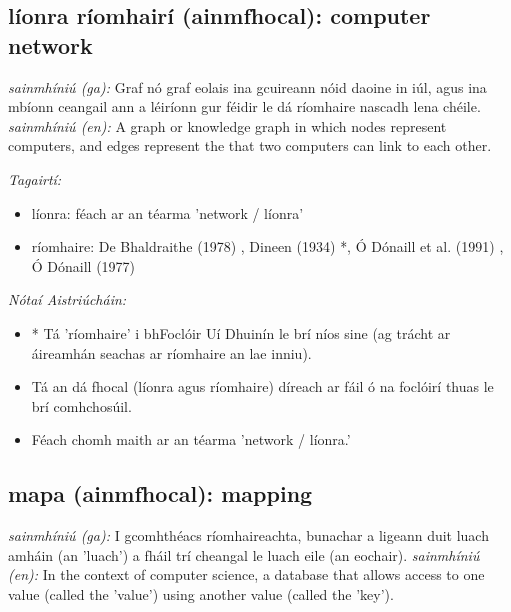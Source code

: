 \documentclass{article}
\begin{document}
\subsection*{líonra ríomhairí (ainmfhocal): computer network} 
 \noindent \textit{sainmhíniú (ga):} Graf nó graf eolais ina gcuireann nóid daoine in iúl, agus ina mbíonn ceangail ann a léiríonn gur féidir le dá ríomhaire nascadh lena chéile.
\newline\newline
 \noindent \textit{sainmhíniú (en):} A graph or knowledge graph in which nodes represent computers, and edges represent the that two computers can link to each other.
\newline

 \noindent \textit{Tagairtí:}
\begin{itemize}
	\item líonra: féach ar an téarma 'network / líonra'
	\item ríomhaire: De Bhaldraithe (1978) \cite{de-bhaldraithe}, Dineen (1934) \cite{dineen}*, Ó Dónaill et al. (1991) \cite{focloir-beag}, Ó Dónaill (1977) \cite{odonaill}
\end{itemize}

 \noindent \textit{Nótaí Aistriúcháin:}
\begin{itemize}
	\item * Tá 'ríomhaire' i bhFoclóir Uí Dhuinín le brí níos sine (ag trácht ar áireamhán seachas ar ríomhaire an lae inniu).
	\item Tá an dá fhocal (líonra agus ríomhaire) díreach ar fáil ó na foclóirí thuas le brí comhchosúil.
	\item Féach chomh maith ar an téarma 'network / líonra.'
\end{itemize}


\subsection*{mapa (ainmfhocal): mapping} 
 \noindent \textit{sainmhíniú (ga):} I gcomhthéacs ríomhaireachta, bunachar a ligeann duit luach amháin (an 'luach') a fháil trí cheangal le luach eile (an eochair).
\newline\newline
 \noindent \textit{sainmhíniú (en):} In the context of computer science, a database that allows access to one value (called the 'value') using another value (called the 'key').
\newline
\end{document}
